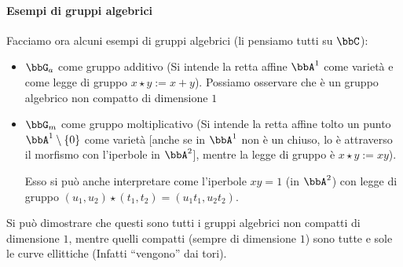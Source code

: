 \paragraph{Esempi di gruppi algebrici}
Facciamo ora alcuni esempi di gruppi algebrici (li pensiamo tutti su $\bbC$):
\begin{itemize}
\item $\bbG_a$ come gruppo additivo (Si intende la retta affine $\bbA^1$ come varietà e come legge di gruppo $x \star y := x + y$). Possiamo osservare che è un gruppo algebrico non compatto di dimensione $1$
\item $\bbG_m$ come gruppo moltiplicativo (Si intende la retta affine tolto un punto $\bbA^1 \setminus \{ 0 \}$ come varietà [anche se in $\bbA^1$ non è un chiuso, lo è attraverso il morfismo con l'iperbole in $\bbA^2$], mentre la legge di gruppo è $x \star y := x y$).

  Esso si può anche interpretare come l'iperbole $xy=1$ (in $\bbA^2$) con legge di gruppo $(u_1, u_2) \star (t_1, t_2) = (u_1 t_1, u_2 t_2)$.
\end{itemize}

Si può dimostrare che questi sono tutti i gruppi algebrici non compatti di dimensione $1$, mentre quelli compatti (sempre di dimensione $1$) sono tutte e sole le curve ellittiche (Infatti ``vengono'' dai tori).



